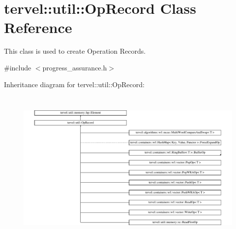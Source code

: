 \hypertarget{classtervel_1_1util_1_1_op_record}{}\section{tervel\+:\+:util\+:\+:Op\+Record Class Reference}
\label{classtervel_1_1util_1_1_op_record}


This class is used to create Operation Records.  




{\ttfamily \#include $<$progress\+\_\+assurance.\+h$>$}

Inheritance diagram for tervel\+:\+:util\+:\+:Op\+Record\+:\begin{figure}[H]
\begin{center}
\leavevmode
\includegraphics[height=7.706422cm]{classtervel_1_1util_1_1_op_record}
\end{center}
\end{figure}
